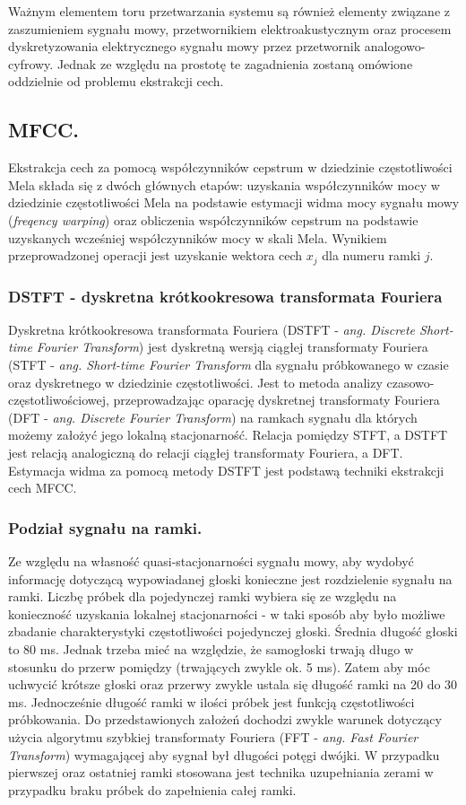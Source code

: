 Ważnym elementem toru przetwarzania systemu są również elementy związane z zaszumieniem sygnału mowy, przetwornikiem elektroakustycznym oraz procesem dyskretyzowania elektrycznego sygnału mowy przez przetwornik analogowo-cyfrowy. Jednak ze względu na prostotę te zagadnienia zostaną omówione oddzielnie od problemu ekstrakcji cech.

\subsection{MFCC.}
\label{mfcc}

Ekstrakcja cech za pomocą współczynników cepstrum w dziedzinie częstotliwości Mela składa się z dwóch głównych etapów: uzyskania współczynników mocy w dziedzinie częstotliwości Mela na podstawie estymacji widma mocy sygnału mowy (\textit{freqency warping}) oraz obliczenia współczynników cepstrum na podstawie uzyskanych wcześniej współczynników mocy w skali Mela. Wynikiem przeprowadzonej operacji jest uzyskanie wektora cech $x_j$ dla numeru ramki $j$.

\subsubsection{DSTFT - dyskretna krótkookresowa transformata Fouriera}
Dyskretna krótkookresowa transformata Fouriera (DSTFT - \textit{ang. Discrete Short-time Fourier Transform}) jest dyskretną wersją ciągłej transformaty Fouriera (STFT - \textit{ang. Short-time Fourier Transform} dla sygnału próbkowanego w czasie oraz dyskretnego w dziedzinie częstotliwości. Jest to metoda analizy czasowo-częstotliwościowej, przeprowadzając oparację dyskretnej transformaty Fouriera (DFT - \textit{ang. Discrete Fourier Transform}) na ramkach sygnału dla których możemy założyć jego lokalną stacjonarność. Relacja pomiędzy STFT, a DSTFT jest relacją analogiczną do relacji ciągłej transformaty Fouriera, a DFT.  Estymacja widma za pomocą metody DSTFT jest podstawą techniki ekstrakcji cech MFCC.

\subsubsection{Podział sygnału na ramki.}
Ze względu na własność quasi-stacjonarności sygnału mowy, aby wydobyć informację dotyczącą wypowiadanej głoski konieczne jest rozdzielenie sygnału na ramki.
Liczbę próbek dla pojedynczej ramki wybiera się ze względu na konieczność uzyskania lokalnej stacjonarności - w taki sposób aby było możliwe zbadanie charakterystyki częstotliwości pojedynczej głoski. Średnia długość głoski to 80 ms. Jednak trzeba mieć na względzie, że samogłoski trwają długo w stosunku do przerw pomiędzy (trwających zwykle ok. 5 ms). Zatem aby móc uchwycić krótsze głoski oraz przerwy zwykle ustala się długość ramki na 20 do 30 ms. Jednocześnie długość ramki w ilości próbek jest funkcją częstotliwości próbkowania. Do przedstawionych założeń dochodzi zwykle warunek dotyczący użycia algorytmu szybkiej transformaty Fouriera (FFT - \textit{ang. Fast Fourier Transform}) wymagającej aby sygnał był długości potęgi dwójki. W przypadku pierwszej oraz ostatniej ramki stosowana jest technika uzupełniania zerami w przypadku braku próbek do zapełnienia całej ramki.

